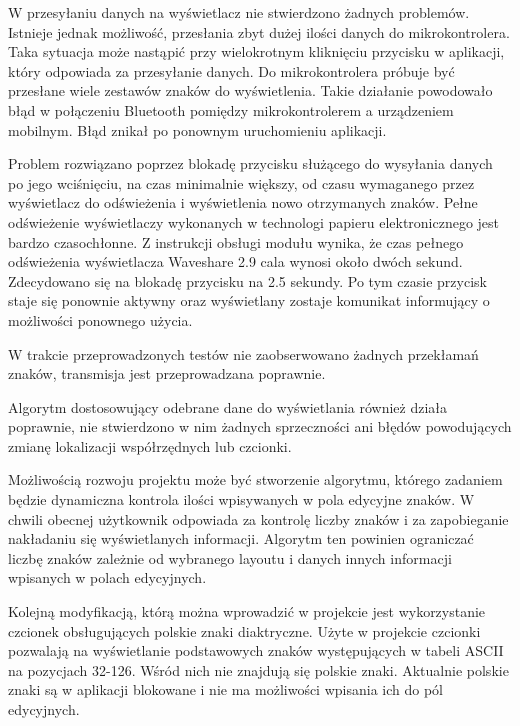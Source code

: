 \documentclass[a4paper,12pt, twoside]{article}
\begin{document}
    	W przesyłaniu danych na wyświetlacz nie stwierdzono żadnych problemów. Istnieje jednak możliwość, przesłania zbyt dużej ilości danych do mikrokontrolera. Taka sytuacja może nastąpić przy wielokrotnym kliknięciu przycisku w aplikacji, który odpowiada za przesyłanie danych. Do mikrokontrolera próbuje być przesłane wiele zestawów znaków do wyświetlenia. Takie działanie powodowało błąd w połączeniu Bluetooth pomiędzy mikrokontrolerem a urządzeniem mobilnym. Błąd znikał po ponownym uruchomieniu aplikacji.
    	
    	Problem rozwiązano poprzez blokadę przycisku służącego do wysyłania danych po jego wciśnięciu, na czas minimalnie większy, od czasu wymaganego przez wyświetlacz do odświeżenia i wyświetlenia nowo otrzymanych znaków. Pełne odświeżenie wyświetlaczy wykonanych w technologi papieru elektronicznego jest bardzo czasochłonne. Z instrukcji obsługi modułu wynika, że czas pełnego odświeżenia wyświetlacza Waveshare 2.9 cala wynosi około dwóch sekund\cite{waveshare}. Zdecydowano się na blokadę przycisku na 2.5 sekundy. Po tym czasie przycisk staje się ponownie aktywny oraz wyświetlany zostaje komunikat informujący o możliwości ponownego użycia. 
    	
    	W trakcie przeprowadzonych testów nie zaobserwowano żadnych przekłamań znaków, transmisja jest przeprowadzana poprawnie. 
    	
    	Algorytm dostosowujący odebrane dane do wyświetlania również działa poprawnie, nie stwierdzono w nim żadnych sprzeczności ani błędów powodujących zmianę lokalizacji współrzędnych lub czcionki.
    	
    	Możliwością rozwoju projektu może być stworzenie algorytmu, którego zadaniem będzie dynamiczna kontrola ilości wpisywanych w pola edycyjne znaków. W chwili obecnej użytkownik odpowiada za kontrolę liczby znaków i za zapobieganie nakładaniu się wyświetlanych informacji. Algorytm ten powinien ograniczać liczbę znaków zależnie od wybranego layoutu i danych innych informacji wpisanych w polach edycyjnych.

        Kolejną modyfikacją, którą można wprowadzić w projekcie jest wykorzystanie czcionek obsługujących polskie znaki diaktryczne. Użyte w projekcie czcionki pozwalają na wyświetlanie podstawowych znaków występujących w tabeli ASCII na pozycjach 32-126. Wśród nich nie znajdują się polskie znaki. Aktualnie polskie znaki są w aplikacji blokowane i nie ma możliwości wpisania ich do pól edycyjnych.
        
\end{document}
